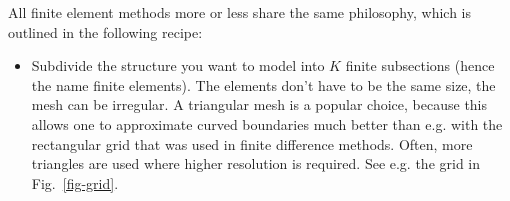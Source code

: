 \pagebreak



All finite element methods more or less share the same philosophy, which is outlined in the following recipe:

\begin{itemize}
\item
Subdivide the structure you want to model into $K$ finite subsections (hence the name finite elements). The elements don't have to be the same size, the mesh can be irregular. A triangular mesh is a popular choice, because this allows one to approximate curved boundaries much better than e.g. with the rectangular grid that was used in finite difference methods. Often, more triangles are used where higher resolution is required. See e.g. the grid in Fig.~\ref{fig-grid}.


\end{itemize}
